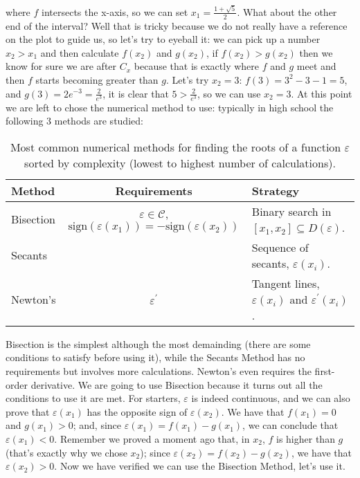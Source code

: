 where $f$ intersects the x-axis, so we can
set $x_1 = \frac{1 + \sqrt{5}}{2}$. What about the other end of the interval?
Well that is tricky because we do not really have a reference on the plot to
guide us, so let's try to
eyeball it: we can pick up a number $x_2 > x_1$ and then calculate $f(x_2)$ and
$g(x_2)$, if $f(x_2) > g(x_2)$ then we know for sure we are after $C_x$ because
that is exactly where $f$ and $g$ meet and then $f$ starts becoming
greater than $g$. Let's try $x_2 = 3$: $f(3) = 3^2 - 3 - 1 = 5$, and
$g(3) = 2e^{-3} = \frac{2}{e^3}$, it is clear that $5 > \frac{2}{e^3}$, so we
can use $x_2 = 3$. At this point we are left to chose the numerical method to use:
typically in high school the following 3 methods are studied:

\begin{table}[h]
    \begin{center}
        \footnotesize%
        \begin{tabular}{lcl}
        \toprule
        Method & Requirements & Strategy \\
        \midrule
        Bisection & $\varepsilon \in \mathcal{C}$, $\text{sign}(\varepsilon(x_1)) = -\text{sign}(\varepsilon(x_2))$ & Binary search
            in $[x_1, x_2] \subseteq D(\varepsilon)$.\\
        Secants & & Sequence of secants, $\varepsilon(x_i)$.\\
        Newton's & $\varepsilon^\prime$ & Tangent lines, $\varepsilon(x_i)$ and $\varepsilon^\prime(x_i)$.\\
        \bottomrule
        \end{tabular}
    \end{center}
    \caption{Most common numerical methods for finding the roots of a function $\varepsilon$ sorted by complexity
    (lowest to highest number of calculations).}
    \label{tab:nummethroots}
\end{table}

Bisection is the simplest although the most demainding (there are some conditions
to satisfy before using it), while the Secants Method has no requirements but involves more
calculations. Newton's even requires the first-order derivative. We are going to use Bisection
because it turns out all the conditions to use it are met.
For starters, $\varepsilon$ is indeed
continuous,
and we can also prove that $\varepsilon(x_1)$ has the
opposite sign of $\varepsilon(x_2)$. We have that $f(x_1) = 0$ and
$g(x_1) > 0$; and, since $\varepsilon(x_1) = f(x_1) - g(x_1)$, we
can conclude that $\varepsilon(x_1) < 0$. Remember we proved a moment ago that, in $x_2$,
$f$ is higher than $g$ (that's exactly why we chose $x_2$);
since $\varepsilon(x_2) = f(x_2) - g(x_2)$, we have that $\varepsilon(x_2) > 0$.
Now we have verified we can use the Bisection Method, let's use it.

